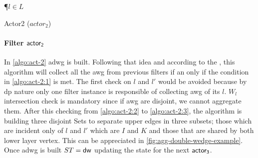 \begin{algorithm}
\SetAlgoRefName{[A6]}
\P{$l \in L$}
\BlankLine
{}
\PC{$|\dwi| \geq 1 \lor \fid$}
\caption{Actor2 ($actor_2$)}
\label{algo:act-2}
\end{algorithm}

\paragraph{Filter $\mathsf{actor_2}$} In \autoref{algo:act-2} \acrshort{adwg} is built. Following that idea and according to the , this algorithm will collect all the \acrshort{awg} 
from previous filters if an only if the condition in \autoref{algo:act-2:1} is met. The first check on $l$ and $l'$ would be avoided because by \acrshort{dp} nature
only one filter instance is responsible of collecting \acrshort{awg} of its $l$. $W_l$ intersection check is mandatory since if \acrshort{awg} are disjoint, we cannot aggregate them.
After this checking from \autoref{algo:act-2:2} to \autoref{algo:act-2:3}, the algorithm is building three disjoint Sets to separate upper edges in three subsets; those which are incident only of 
$l$ and $l'$ which are $I$ and $K$ and those that are shared by both lower layer vertex. This can be appreciated in \autoref{fig:agg-double-wedge-example}.
Once \acrshort{adwg} is built $ST = \mathsf{dw}$ updating the state for the next $\mathsf{actor_3}$.


